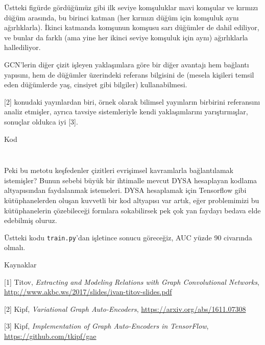 \documentclass[12pt,fleqn]{article}\usepackage{../../common}
\begin{document}
Üstteki figürde gördüğümüz gibi ilk seviye komşuluklar mavi komşular ve
kırmızı düğüm arasında, bu birinci katman (her kırmızı düğüm için komşuluk
aynı ağırlıklarla). İkinci katmanda komşunun komşusu sarı düğümler de dahil
ediliyor, ve bunlar da farklı (ama yine her ikinci seviye komşuluk için
aynı) ağırlıklarla hallediliyor.

GCN'lerin diğer çizit işleyen yaklaşımlara göre bir diğer avantajı hem
bağlantı yapısını, hem de düğümler üzerindeki referans bilgisini de (mesela
kişileri temsil eden düğümlerde yaş, cinsiyet gibi bilgiler)
kullanabilmesi. 

[2] konudaki yayınlardan biri, örnek olarak bilimsel yayınların
birbirini referansını analiz etmişler, ayrıca tavsiye sistemleriyle kendi
yaklaşımlarını yarıştırmışlar, sonuçlar oldukca iyi [3].

Kod

\inputminted[fontsize=\footnotesize]{python}{util.py}

\inputminted[fontsize=\footnotesize]{python}{train.py}

Peki bu metotu keşfedenler çizitleri evrişimsel kavramlarla bağlantılamak
istemişler? Bunun sebebi büyük bir ihtimalle mevcut DYSA hesaplayan kodlama
altyapısından faydalanmak istemeleri. DYSA hesaplamak için Tensorflow gibi
kütüphanelerden oluşan kuvvetli bir kod altyapısı var artık, eğer
problemimizi bu kütüphanelerin çözebileceği formlara sokabilirsek pek çok
yan faydayı bedava elde edebilmiş oluruz. 

Üstteki kodu \verb!train.py!'dan işletince sonucu göreceğiz, AUC yüzde 90
civarında olmalı.

Kaynaklar

[1] Titov, {\em Extracting and Modeling Relations with Graph Convolutional Networks}, \url{http://www.akbc.ws/2017/slides/ivan-titov-slides.pdf}

[2] Kipf, {\em Variational Graph Auto-Encoders}, \url{https://arxiv.org/abs/1611.07308}

[3] Kipf, {\em Implementation of Graph Auto-Encoders in TensorFlow}, \url{https://github.com/tkipf/gae}
\end{document}
